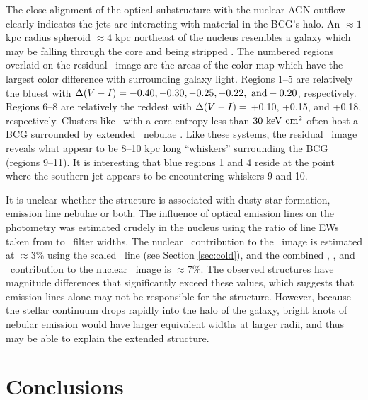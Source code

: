 \documentclass[apjpt4]{aastex}
\begin{document}
The close alignment of the optical substructure with the nuclear AGN
outflow clearly indicates the jets are interacting with material in
the BCG's halo. An $\approx 1$ kpc radius spheroid $\approx 4$ kpc
northeast of the nucleus resembles a galaxy which may be falling
through the core and being stripped \citep[see][for
  example]{2007ApJ...671..190S}. The numbered regions overlaid on the
residual \myv\ image are the areas of the color map which have the
largest color difference with surrounding galaxy light. Regions 1--5
are relatively the bluest with $\Delta(V-I) = -0.40, -0.30,
-0.25, -0.22, ~\rm{and} -0.20$, respectively. Regions 6--8 are
relatively the reddest with $\Delta(V-I) =$ +0.10, +0.15, and
+0.18, respectively. Clusters like \rbs\ with a core entropy less than
$30 ~\rm{\mbox{\ensuremath{\rm{keV}}}~\ensuremath{\rm{\mbox{\ensuremath{\rm{cm}}}^2}}}$ often host a BCG surrounded by extended \halpha\ nebulae
\citep[\eg][]{mcdonald10}. Like these systems, the residual
\myi\ image reveals what appear to be 8--10 kpc long ``whiskers''
surrounding the BCG (regions 9--11). It is interesting that blue
regions 1 and 4 reside at the point where the southern jet appears to
be encountering whiskers 9 and 10.

It is unclear whether the structure is associated with dusty star
formation, emission line nebulae or both. The influence of optical
emission lines on the photometry was estimated crudely in the nucleus
using the ratio of line EWs taken from \citet{rbs1} to \hst\ filter
widths. The nuclear \halpha\ contribution to the \myi\ image is
estimated at $\approx 3\%$ using the scaled \hbeta\ line (see Section
\ref{sec:cold}), and the combined \hbeta, \oii, and
\oiii\ contribution to the nuclear \myv\ image is $\approx 7\%$. The
observed structures have magnitude differences that significantly
exceed these values, which suggests that emission lines alone may not
be responsible for the structure. However, because the stellar
continuum drops rapidly into the halo of the galaxy, bright knots of
nebular emission would have larger equivalent widths at larger radii,
and thus may be able to explain the extended structure.

\section{Conclusions}
\label{sec:con}
\end{document}
